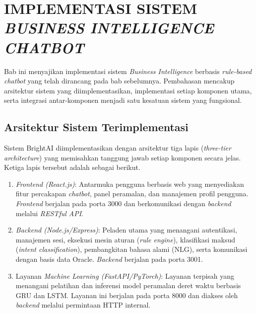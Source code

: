 \cleardoublepage
\chapter{IMPLEMENTASI SISTEM \textit{BUSINESS INTELLIGENCE CHATBOT}}
\label{chap:implementasi}

Bab ini menyajikan implementasi sistem \textit{Business Intelligence} berbasis \textit{rule-based chatbot} yang telah dirancang pada bab sebelumnya. Pembahasan mencakup arsitektur sistem yang diimplementasikan, implementasi setiap komponen utama, serta integrasi antar-komponen menjadi satu kesatuan sistem yang fungsional.

\section{Arsitektur Sistem Terimplementasi}
\label{sec:arsitektur-terimplementasi}

Sistem BrightAI diimplementasikan dengan arsitektur tiga lapis (\textit{three-tier architecture}) yang memisahkan tanggung jawab setiap komponen secara jelas. Ketiga lapis tersebut adalah sebagai berikut.

\begin{enumerate}
    \item \textit{Frontend (React.js)}: Antarmuka pengguna berbasis web yang menyediakan fitur percakapan \textit{chatbot}, panel peramalan, dan manajemen profil pengguna. \textit{Frontend} berjalan pada porta 3000 dan berkomunikasi dengan \textit{backend} melalui \textit{RESTful API}.
    \item \textit{Backend (Node.js/Express)}: Peladen utama yang menangani autentikasi, manajemen sesi, eksekusi mesin aturan (\textit{rule engine}), klasifikasi maksud (\textit{intent classification}), pembangkitan bahasa alami (NLG), serta komunikasi dengan basis data Oracle. \textit{Backend} berjalan pada porta 3001.
    \item Layanan \textit{Machine Learning (FastAPI/PyTorch)}: Layanan terpisah yang menangani pelatihan dan inferensi model peramalan deret waktu berbasis GRU dan LSTM. Layanan ini berjalan pada porta 8000 dan diakses oleh \textit{backend} melalui permintaan HTTP internal.
\end{enumerate}

